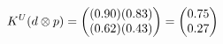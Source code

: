 \documentclass[preview]{standalone}
\begin{document}
\begin{align*}
\special{dvisvgm:raw <g id='unique000'>}K^U(d \otimes p) = \begin{pmatrix} (0.90)(0.83) \\ (0.62)(0.43) \end{pmatrix} = \begin{pmatrix} 0.75 \\ 0.27 \end{pmatrix}\special{dvisvgm:raw </g>}
\end{align*}
\end{document}
